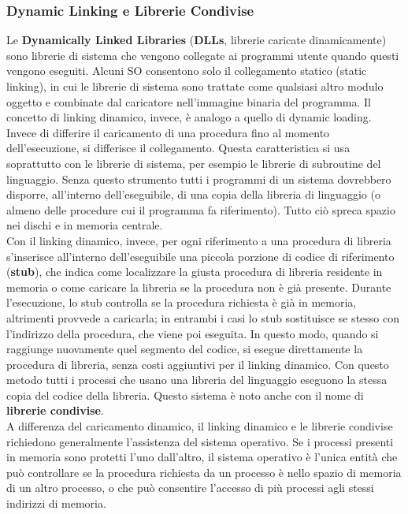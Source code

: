 \documentclass{article}
\begin{document}
			\subsubsection{Dynamic Linking e Librerie Condivise}
				Le \textbf{Dynamically Linked Libraries} (\textbf{DLLs}, librerie caricate dinamicamente) sono librerie di sistema che vengono collegate ai programmi utente quando questi vengono eseguiti. Alcuni SO consentono solo il collegamento statico (static linking), in cui le librerie di sistema sono trattate come qualsiasi altro modulo oggetto e combinate dal caricatore nell’immagine binaria del programma. Il concetto di linking dinamico, invece, è analogo a quello di dynamic loading. Invece di differire il caricamento di una procedura fino al momento dell’esecuzione, si differisce il collegamento. Questa caratteristica si usa soprattutto con le librerie di sistema, per esempio le librerie di subroutine del linguaggio. Senza questo strumento tutti i programmi di un sistema dovrebbero disporre, all’interno dell’eseguibile, di una copia della libreria di linguaggio (o almeno delle procedure cui il programma fa riferimento). Tutto ciò spreca spazio nei dischi e in memoria centrale.
				\\Con il linking dinamico, invece, per ogni riferimento a una procedura di libreria s’inserisce all’interno dell’eseguibile una piccola porzione di codice di riferimento (\textbf{stub}), che indica come localizzare la giusta procedura di libreria residente in memoria o come caricare la libreria se la procedura non è già presente. Durante l’esecuzione, lo stub controlla se la procedura richiesta è già in memoria, altrimenti provvede a caricarla; in entrambi i casi lo stub sostituisce se stesso con l’indirizzo della procedura, che viene poi eseguita. In questo modo, quando si raggiunge nuovamente quel segmento del codice, si esegue direttamente la procedura di libreria, senza costi aggiuntivi per il linking dinamico. Con questo metodo tutti i processi che usano una libreria del linguaggio eseguono la stessa copia del codice della libreria. Questo sistema è noto anche con il nome di \textbf{librerie condivise}.
				\\A differenza del caricamento dinamico, il linking dinamico e le librerie condivise richiedono generalmente l’assistenza del sistema operativo. Se i processi presenti in memoria sono protetti l’uno dall’altro, il sistema operativo è l’unica entità che può controllare se la procedura richiesta da un processo è nello spazio di memoria di un altro processo, o che può consentire l’accesso di più processi agli stessi indirizzi di memoria.
\end{document}
